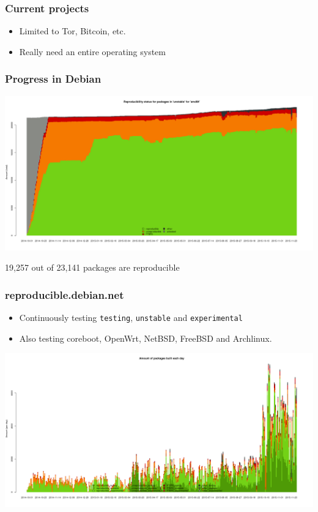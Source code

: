 \documentclass[14pt,aspectratio=169]{beamer}
\begin{document}
\begin{frame}[fragile]
 \frametitle{Current projects} \pause
 \begin{itemize}
  \item Limited to Tor, Bitcoin, etc. \pause
  \item Really need an entire operating system
 \end{itemize}
\end{frame}

\begin{frame}[plain]
 \frametitle{Progress in Debian}
 \pause
 \begin{center}
  \includegraphics[height=0.73\paperheight]{images/stats_pkg_state.png}

  \footnotesize{19,257 out of 23,141 packages are reproducible}
  \vfill
 \end{center}
\end{frame}

\begin{frame}
 \frametitle{reproducible.debian.net}
 \pause

 \begin{itemize}
  \item Continuously testing \texttt{testing}, \texttt{unstable} and \texttt{experimental}
  \item Also testing coreboot, OpenWrt, NetBSD, FreeBSD and Archlinux.
 \end{itemize}
 \vfill
 \begin{center}
  \includegraphics[height=0.47\paperheight]{images/stats_builds_per_day_amd64.png}
 \end{center}
\end{frame}
\end{document}
